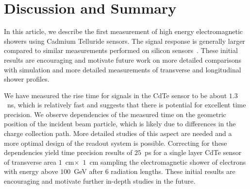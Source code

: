 
\section{Discussion and Summary}
\label{sec:summary} 


In this article, we describe the first measurement of high energy 
electromagnetic showers using Cadmium Telluride sensors. 
The signal response is generally larger compared to similar measurements
performed on silicon sensors~\cite{SiliconTiming}.
These initial results are encouraging and motivate future work on 
more detailed comparisons with simulation and more detailed 
measurements of transverse and longitudinal shower profiles.





We have measured the rise time for signals in the CdTe sensor to be about $1.3$~ns, which
is relatively fast and suggests that there is potential for excellent time precision.
We observe dependencies of the measured time on the geometric position of the
incident beam particle, which is likely due to differences in the charge collection
path. More detailed studies of this aspect are needed and a more optimal design of the 
readout system is possible. Correcting for these dependencies yield time precision results
of $25$~ps for a single layer CdTe sensor of transverse area $1$~cm$\times$~$1$~cm
sampling the electromagnetic shower of electrons with energy above $100$~GeV 
after $6$ radiation lengths. These initial results are encouraging and motivate 
further in-depth studies in the future.



